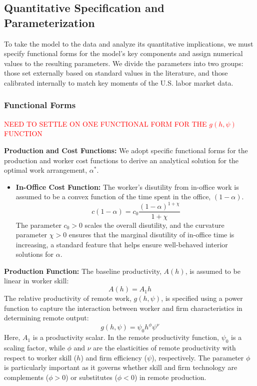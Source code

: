 \documentclass[
  11pt,
  letterpaper,
  DIV=11,
  numbers=noendperiod]{scrartcl}
\providecommand{\tightlist}{%
  \setlength{\itemsep}{0pt}\setlength{\parskip}{0pt}}\usepackage{longtable,booktabs,array}
\begin{document}
\subsection{Quantitative Specification and
Parameterization}\label{quantitative-specification-and-parameterization}

To take the model to the data and analyze its quantitative implications,
we must specify functional forms for the model's key components and
assign numerical values to the resulting parameters. We divide the
parameters into two groups: those set externally based on standard
values in the literature, and those calibrated internally to match key
moments of the U.S. labor market data.

\subsubsection{Functional Forms}\label{functional-forms}

\textcolor{red}{NEED TO SETTLE ON ONE FUNCTIONAL FORM FOR THE $g(h, \psi)$ FUNCTION}

\textbf{Production and Cost Functions:} We adopt specific functional
forms for the production and worker cost functions to derive an
analytical solution for the optimal work arrangement, \(\alpha^*\).

\begin{itemize}
\tightlist
\item
  \textbf{In-Office Cost Function:} The worker's disutility from
  in-office work is assumed to be a convex function of the time spent in
  the office, \((1-\alpha)\).
  \[c(1-\alpha) = c_0 \frac{(1-\alpha)^{1+\chi}}{1+\chi}\] The parameter
  \(c_0 > 0\) scales the overall disutility, and the curvature parameter
  \(\chi > 0\) ensures that the marginal disutility of in-office time is
  increasing, a standard feature that helps ensure well-behaved interior
  solutions for \(\alpha\).
\end{itemize}

\textbf{Production Function:} The baseline productivity, \(A(h)\), is
assumed to be linear in worker skill: \[A(h) = A_1 h\]The relative
productivity of remote work, \(g(h, \psi)\), is specified using a power
function to capture the interaction between worker and firm
characteristics in determining remote output:
\[g(h, \psi) = \psi_0 h^\phi \psi^\nu\]Here, \(A_1\) is a productivity
scalar. In the remote productivity function, \(\psi_0\) is a scaling
factor, while \(\phi\) and \(\nu\) are the elasticities of remote
productivity with respect to worker skill (\(h\)) and firm efficiency
(\(\psi\)), respectively. The parameter \(\phi\) is particularly
important as it governs whether skill and firm technology are
complements (\(\phi > 0\)) or substitutes (\(\phi < 0\)) in remote
production.
\end{document}
